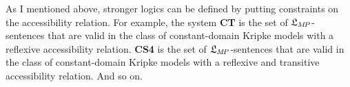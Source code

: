 
%


As I mentioned above, stronger logics can be defined by putting constraints on
the accessibility relation. For example, the system \textbf{CT} is the set of
$\mathfrak{L}_{M\!P}$-sentences that are valid in the class of constant-domain Kripke
models with a reflexive accessibility relation. \textbf{CS4} is the set of
$\mathfrak{L}_{M\!P}$-sentences that are valid in the class of constant-domain Kripke
models with a reflexive and transitive accessibility relation. And so on.

